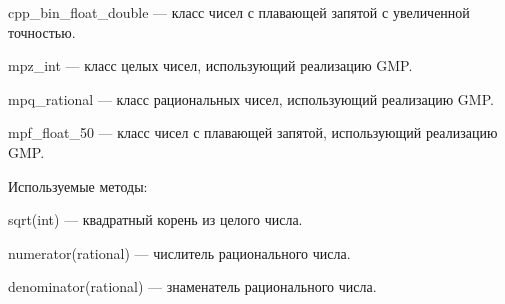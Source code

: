 cpp\_bin\_float\_double --- класс чисел с плавающей запятой с увеличенной точностью.

mpz\_int --- класс целых чисел, использующий реализацию GMP.

mpq\_rational --- класс рациональных чисел, использующий реализацию GMP.

mpf\_float\_50 --- класс чисел с плавающей запятой, использующий реализацию GMP.

Используемые методы:

sqrt(int) --- квадратный корень из целого числа.

numerator(rational) --- числитель рационального числа.

denominator(rational) --- знаменатель рационального числа.

\clearpage